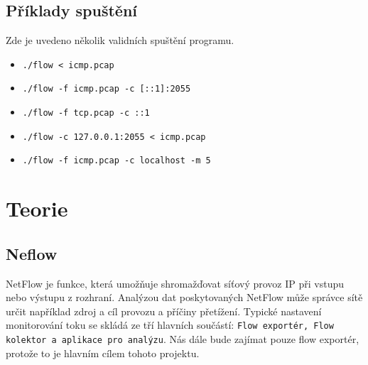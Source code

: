 \documentclass[12pt]{article}
\begin{document}
\subsection*{Příklady spuštění}
Zde je uvedeno několik validních spuštění programu.
\begin{itemize}
	\item \texttt{./flow < icmp.pcap}
	\item \texttt{./flow -f icmp.pcap -c [::1]:2055}
	\item \texttt{./flow -f tcp.pcap -c ::1}
	\item \texttt{./flow -c 127.0.0.1:2055 < icmp.pcap}
	\item \texttt{./flow -f icmp.pcap -c localhost -m 5}
\end{itemize}
\pagebreak
\section{Teorie}
\subsection{Neflow}
NetFlow \cite{NT} je funkce, která umožňuje shromažďovat síťový provoz IP při vstupu nebo výstupu z rozhraní.
Analýzou dat poskytovaných NetFlow může správce sítě určit například zdroj a cíl provozu a příčiny přetížení. 
Typické nastavení monitorování toku se skládá ze tří hlavních součástí: \texttt{Flow exportér, Flow kolektor a aplikace pro analýzu}. Nás dále bude zajímat pouze flow exportér, protože to je hlavním cílem tohoto projektu.
\end{document}
